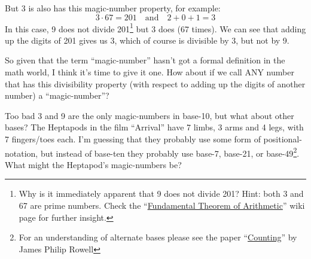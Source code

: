 \documentclass{article}
\begin{document}
But 3 is also has this magic-number property, for example:
\[ 3\cdot{}67=201 \quad\text{and}\quad 2+0+1=3\]
In this case, 9 does not divide 201\footnote{Why is it immediately
apparent that 9 does not divide 201? Hint: both 3 and 67 are prime numbers.
Check the ``\href{https://en.wikipedia.org/wiki/Fundamental_theorem_of_arithmetic}{Fundamental
Theorem of Arithmetic}'' wiki page for further insight.}
but 3 does (67 times).
We can see that adding up the digits of 201 gives us 3,
which of course is divisible by 3, but not by 9.

So given that the term ``magic-number'' hasn't got
a formal definition in the math world, I think it's time to give it one.
How about if we call ANY number that has this
divisibility property (with respect to adding up the digits of another number) a ``magic-number''?

Too bad 3 and 9 are the only magic-numbers in base-10,
but what about other bases?
The Heptapods in the film ``Arrival'' have 7 limbs, 3 arms and 4 legs, with 7 fingers/toes each.
I'm guessing that they probably use some form of positional-notation,
but instead of base-ten they probably use base-7, base-21,
or base-49\footnote{For an understanding of alternate bases please see
the paper ``\href {https://www.dropbox.com/s/bwmrffmkcidnf27/basisReprThm.pdf?dl=0}
{Counting}'' by James Philip Rowell}. What might the Heptapod's magic-numbers be?
\end{document}
